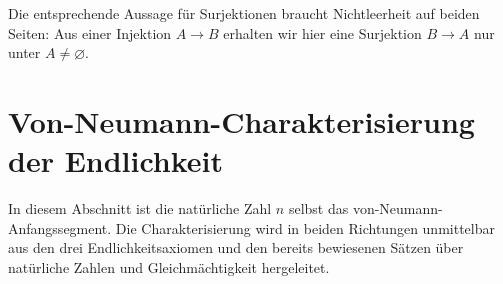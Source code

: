 \documentclass[main.tex]{subfiles}
\begin{document}
Die entsprechende Aussage für Surjektionen braucht Nichtleerheit auf beiden
Seiten: Aus einer Injektion \(A\to B\) erhalten wir hier eine Surjektion
\(B\to A\) nur unter \(A\neq\varnothing\).

\begin{tabproof}


\end{tabproof}

\chapter{Von-Neumann-Charakterisierung der Endlichkeit}

In diesem Abschnitt ist die natürliche Zahl \(n\) selbst das von-Neumann-
Anfangssegment.  Die Charakterisierung wird in beiden Richtungen unmittelbar
aus den drei Endlichkeitsaxiomen und den bereits bewiesenen Sätzen über
natürliche Zahlen und Gleichmächtigkeit hergeleitet.
\end{document}
